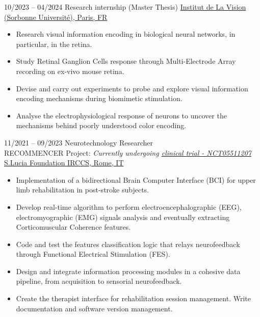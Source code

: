 \documentclass[9pt]{developercv} %
\begin{document}
\vspace{-1 pt}
\begin{entrylist}
	\entry
        {10/2023 -- 04/2024}
		{ Research internship (Master Thesis)}
		{\textcolor{blue}{{\href{https://www.institut-vision.org/en/}{Institut de La Vision (Sorbonne Université), Paris, FR}}}}
		{\vspace{-10pt}
        \begin{itemize}[noitemsep,topsep=0pt,parsep=0pt,partopsep=0pt, leftmargin=-1pt]
            \item Research visual information encoding in biological neural networks, in particular, in the retina.
            \item Study Retinal Ganglion Cells response through Multi-Electrode Array recording on ex-vivo mouse retina.
            \item Devise and carry out experiments to probe and explore visual information encoding mechanisms during biomimetic stimulation.
            \item Analyse the electrophysiological response of neurons to uncover the mechanisms behind poorly understood color encoding.
            
        \end{itemize} 
        
        }
        
	\entry
		{11/2021 -- 09/2023}
		{Neurotechnology Researcher \\\footnotesize{RECOMMENCER Project: \textit{Currently undergoing \textcolor{blue}{\href{https://clinicaltrials.gov/study/NCT05511207}{clinical trial - NCT05511207}}}}}
		{\textcolor{blue}{\href{https://www.hsantalucia.it/laboratorio-immagini-neuroelettriche-interfacce-cervello-computer}{S.Lucia Foundation IRCCS, Rome, IT}}}
		{\vspace{-10pt}
        \begin{itemize}[noitemsep,topsep=0pt,parsep=0pt,partopsep=0pt, leftmargin=-1pt]
            \item Implementation of a bidirectional Brain Computer Interface (BCI) for upper limb rehabilitation in post-stroke subjects.
            \item Develop real-time algorithm to perform electroencephalographic (EEG), electromyographic (EMG) signals analysis and eventually extracting Corticomuscular Coherence features.
            \item Code and test the features classification logic that relays neurofeedback through Functional Electrical Stimulation (FES).
            \item Design and integrate information processing modules in a cohesive data pipeline, from acquisition to sensorial neurofeedback.
            \item Create the therapist interface for rehabilitation session management. Write documentation and software version management.
        \end{itemize} 
        }
\end{entrylist}
\end{document}
